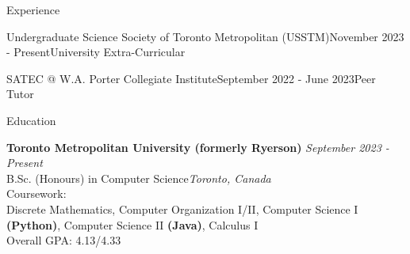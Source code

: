 \documentclass[
	10pt, %
]{resume} %
\begin{document}
\begin{rSection}{Experience}

	\begin{rSubsection}{Undergraduate Science Society of Toronto Metropolitan (USSTM)}{November 2023 - Present}{University Extra-Curricular}{}
	\end{rSubsection}


	\begin{rSubsection}{SATEC @ W.A. Porter Collegiate Institute}{September 2022 - June 2023}{Peer Tutor}{}
	\end{rSubsection}


 \end{rSection}

\setstretch{}
\begin{rSection}{Education}
	
	\textbf{Toronto Metropolitan University (formerly Ryerson)} \hfill \textit{September 2023 - Present} \\ 
	B.Sc. (Honours) in Computer Science\hfill \textit{Toronto, Canada} \smallskip\\
	Coursework: \\
	Discrete Mathematics, Computer Organization I/II, Computer Science I \textbf{(Python)}, Computer Science II \textbf{(Java)}, Calculus I \\
	Overall GPA: 4.13/4.33
	
\end{rSection}

\end{document}
